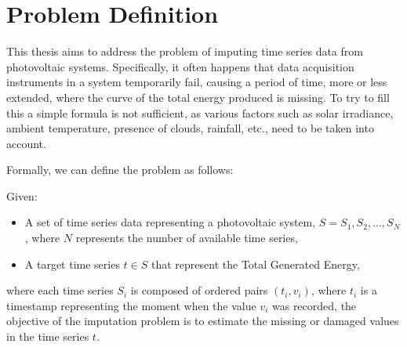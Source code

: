 \section{Problem Definition}
This thesis aims to address the problem of imputing time series data from
photovoltaic systems. Specifically, it often happens that data acquisition
instruments in a system temporarily fail, causing a period of time, more or
less extended, where the curve of the total energy produced is missing.
To try to fill this  a simple formula is not sufficient,
as various factors such as solar irradiance, ambient temperature,
presence of clouds, rainfall, etc., need to be taken into account.

Formally, we can define the problem as follows:

\begin{definition}
	Given:
	\begin{itemize}
		\item A set of time series data representing a photovoltaic
		      system, $S = {S_1, S_2, \ldots, S_N}$, where $N$ represents
		      the number of available time series,
		\item A target time series $t \in S$ that represent the Total Generated Energy,
	\end{itemize}
	where each time series $S_i$ is composed of ordered pairs $(t_i, v_i)$, where $t_i$ is
	a timestamp representing the moment when the value $v_i$ was recorded,
	the objective of the imputation problem is to estimate the missing or damaged values
	in the time series $t$.
\end{definition}

